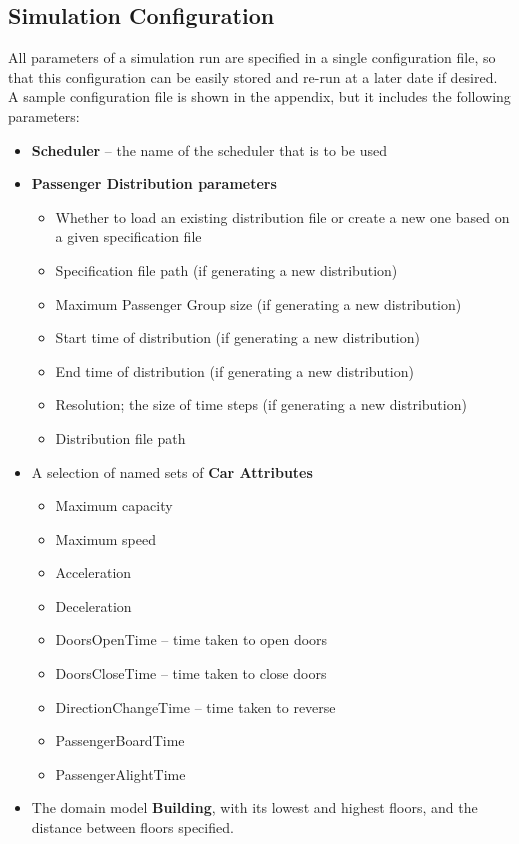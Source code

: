 \documentclass{UoYCSproject}
\begin{document}
\subsection{Simulation Configuration}
All parameters of a simulation run are specified in a single configuration file, so that this configuration can be easily stored and re-run at a later date if desired.  A sample configuration file is shown in the appendix, but it includes the following parameters:
\begin{itemize}
	\item \textbf{Scheduler} -- the name of the scheduler that is to be used
	\item \textbf{Passenger Distribution parameters}
	\begin{itemize}
		\item Whether to load an existing distribution file or create a new one based on a given specification file
		\item Specification file path (if generating a new distribution)
		\item Maximum Passenger Group size (if generating a new distribution)
		\item Start time of distribution (if generating a new distribution)
		\item End time of distribution (if generating a new distribution)
		\item Resolution; the size of time steps (if generating a new distribution)
		\item Distribution file path
	\end{itemize}
	\item A selection of named sets of \textbf{Car Attributes}
	\begin{itemize}
		\item Maximum capacity
		\item Maximum speed
		\item Acceleration
		\item Deceleration
		\item DoorsOpenTime -- time taken to open doors
		\item DoorsCloseTime -- time taken to close doors
		\item DirectionChangeTime -- time taken to reverse
		\item PassengerBoardTime
		\item PassengerAlightTime
	\end{itemize}
	\item The domain model \textbf{Building}, with its lowest and highest floors, and the distance between floors specified.

\end{itemize}
\end{document}
